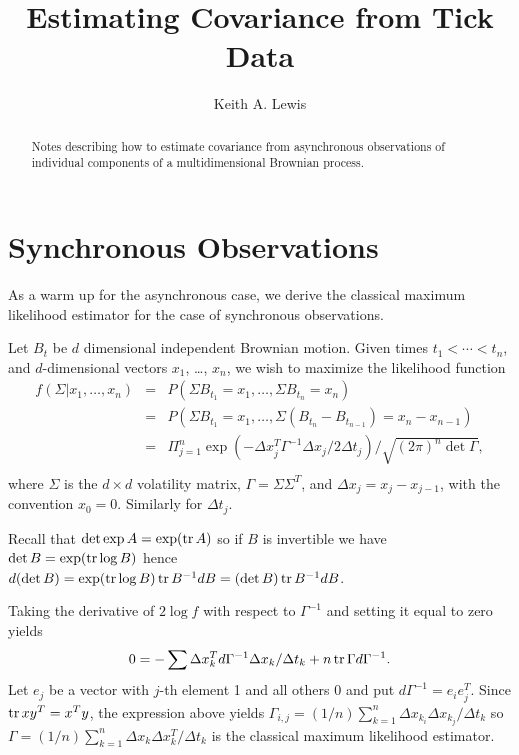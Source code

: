 \documentclass[11pt,fleqn]{article}
\def\tr{\qopname\relax n{tr}}
\begin{document}
\title{Estimating Covariance from Tick Data}
\author{Keith A. Lewis}
\maketitle

\begin{abstract}
Notes describing how to estimate covariance from asynchronous
observations of individual components of a multidimensional
Brownian process.
\end{abstract}

\section{Synchronous Observations}
As a warm up for the asynchronous case, we derive the classical
maximum likelihood estimator for the case of synchronous observations.

Let $B_t$ be $d$ dimensional independent Brownian motion.
Given times $t_1 < \cdots < t_n$, and $d$-dimensional vectors $x_1$,
\dots, $x_n$,
we wish to maximize the likelihood function
\begin{eqnarray*}
f(\Sigma|x_1,\dots,x_n) &=& P(\Sigma B_{t_1} = x_1, \dots,
	\Sigma B_{t_n} = x_n)\\
	&=& P(\Sigma B_{t_1} = x_1, \dots,
		\Sigma(B_{t_n} - B_{t_{n-1}}) = x_n - x_{n-1})\\
	&=& \Pi_{j = 1}^n \exp(-\Delta x_j^T \Gamma^{-1}\Delta x_j/2\Delta t_j)
			/\sqrt{(2\pi)^n\det\Gamma},\\
\end{eqnarray*}
where $\Sigma$ is the $d\times d$ volatility matrix,
$\Gamma = \Sigma\Sigma^T$,
and $\Delta x_j = x_j - x_{j - 1}$, with the convention $x_0 = 0$.
Similarly for $\Delta t_j$.

Recall that $\det\exp A = \exp(\tr A)$ so if $B$ is invertible
we have $\det B = \exp(\tr\log B)$ hence $d(\det B) = \exp(\tr\log B)
\tr B^{-1}dB = (\det B) \tr B^{-1}dB$.

Taking the derivative of $2\log f$ with respect to $\Gamma^{-1}$
and setting it equal to zero yields
\begin{equation*}
	0 = -\sum \Delta x_k^T d\Gamma^{-1}\Delta x_k/\Delta t_k
		+ n\tr \Gamma d\Gamma^{-1}.
\end{equation*}
Let $e_j$ be a vector with $j$-th element 1 and all others 0 and put
$d\Gamma^{-1} = e_ie_j^T$. Since $\tr xy^T = x^Ty$, the expression
above yields $\Gamma_{i,j} = (1/n)\sum_{k = 1}^n \Delta x_{k_i} \Delta
x_{k_j}/\Delta t_k$ so $\Gamma = (1/n)\sum_{k=1}^n \Delta x_k \Delta
x_k^T/\Delta t_k$ is the classical maximum likelihood estimator.
\end{document}
